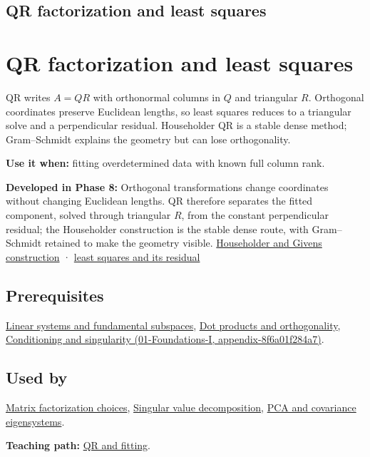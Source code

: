 \hypertarget{appendix-c3421e6b4f2c}{}
\section*{QR factorization and least squares}
\chapter{QR factorization and least squares}\label{appendix-c3421e6b4f2c-qr-factorization-and-least-squares}

QR writes \(A=QR\) with orthonormal columns in \(Q\) and triangular \(R\). Orthogonal coordinates preserve Euclidean lengths, so least squares reduces to a triangular solve and a perpendicular residual. Householder QR is a stable dense method; Gram--Schmidt explains the geometry but can lose orthogonality.

\textbf{Use it when:} fitting overdetermined data with known full column rank.

\textbf{Developed in Phase 8:} Orthogonal transformations change coordinates without changing Euclidean lengths. QR therefore separates the fitted component, solved through triangular \(R\), from the constant perpendicular residual; the Householder construction is the stable dense route, with Gram--Schmidt retained to make the geometry visible. \href{Continuous\%20Notes/Computing\%20Foundations\%20-\%20From\%20Bits\%20to\%20C++\%20and\%20Systems\%20APIs\#Reflections\%20and\%20plane\%20rotations\%20build\%20QR\%20without\%20losing\%20lengths}{Householder and Givens construction} · \href{Continuous\%20Notes/Computing\%20Foundations\%20-\%20From\%20Bits\%20to\%20C++\%20and\%20Systems\%20APIs\#QR\%20turns\%20least\%20squares\%20into\%20a\%20triangular\%20solve\%20plus\%20an\%20irreducible\%20residual}{least squares and its residual}

\section{Prerequisites}\label{appendix-c3421e6b4f2c-prerequisites}

\hyperref[appendix-8572a4a060c1]{Linear systems and fundamental subspaces}, \hyperref[appendix-8bc4e8fc547c]{Dot products and orthogonality}, \href{../01-Foundations-I/main.pdf\#nameddest=appendix-8f6a01f284a7}{Conditioning and singularity (01-Foundations-I, appendix-8f6a01f284a7)}.

\section{Used by}\label{appendix-c3421e6b4f2c-used-by}

\hyperref[appendix-221a483bec2d]{Matrix factorization choices}, \hyperref[appendix-1fad5e7f36fa]{Singular value decomposition}, \hyperref[appendix-ad175ef3c5bf]{PCA and covariance eigensystems}.

\textbf{Teaching path:} \href{Continuous\%20Notes/Computing\%20Foundations\%20-\%20From\%20Bits\%20to\%20C++\%20and\%20Systems\%20APIs\#Structure\%20makes\%20a\%20decomposition\%20a\%20better\%20tool\%20than\%20generic\%20elimination}{QR and fitting}.
